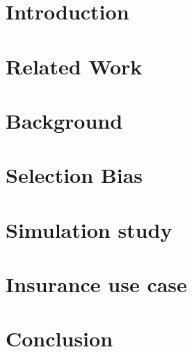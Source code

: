 \documentclass[12pt]{article}
\begin{document}
\newpage
\tableofcontents

\newpage


    
\section{Introduction}
\label{intro}

\newpage

\section{Related Work}
\label{related}

\newpage

\section{Background}
\label{background}

\newpage

\section{Selection Bias}
\label{selection}

\newpage

\section{Simulation study}
\label{simulation}

\newpage

\section{Insurance use case}
\label{usecase}

\newpage



\section{Conclusion}
\label{conclusion}


\newpage

    
\end{document}
